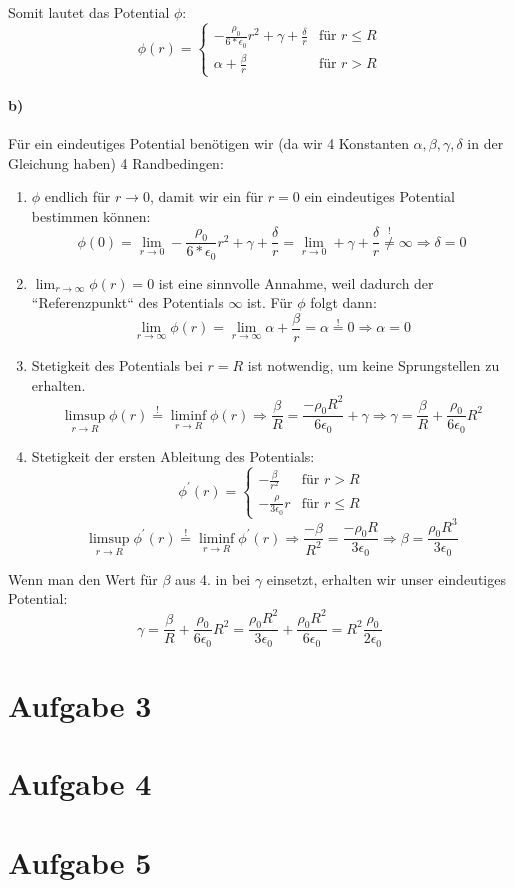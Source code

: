 \documentclass[a4paper]{article}
\newcommand{\epszero}{\epsilon_0}
\begin{document}
Somit lautet das Potential $\phi$:
\[
	\phi(r) =
	\begin{cases}
		-\frac{\rho_0}{6 * \epszero} r^2 + \gamma + \frac\delta r
		&\text{für } r \leq R \\
		\alpha + \frac\beta r 
		&\text{für } r > R
	\end{cases}
\]

\newpage
\paragraph{b)}
Für ein eindeutiges Potential benötigen wir (da wir 4 Konstanten $\alpha, \beta, \gamma, \delta$ in der Gleichung haben) 4 Randbedingen:
\begin{enumerate}
	\item $\phi$ endlich für $r\rightarrow 0$, damit wir ein für $r=0$ 
		ein eindeutiges Potential bestimmen können:
		\[
			\phi(0) = \lim_{r\rightarrow0} 
			-\frac{\rho_0}{6 * \epszero} r^2 
			+ \gamma 
			+ \frac\delta r
			= \lim_{r\rightarrow0} + \gamma
			+ \frac\delta r \overset{!}{\neq} \infty
			\Rightarrow
			\delta = 0
		\]
	\item $\lim_{r\rightarrow\infty} \phi(r) = 0$ ist eine sinnvolle 
		Annahme, weil dadurch der ``Referenzpunkt`` des Potentials 
		$\infty$ ist. Für $\phi$ folgt dann:
		\[
			\lim_{r\rightarrow\infty}
			\phi(r) 
			= \lim_{r\rightarrow\infty}
			\alpha + \frac\beta r 
			= \alpha 
			\overset{!}{=} 0
			\Rightarrow
			\alpha = 0
			\]
	\item Stetigkeit des Potentials bei $r = R$ ist notwendig, um keine
		Sprungstellen zu erhalten.
		\[
			\limsup_{r\rightarrow R} \phi(r)
			\overset{!}{=}
			\liminf_{r\rightarrow R} \phi(r)
			\Rightarrow
			\frac{\beta}{R} = 
			\frac{-\rho_0 R^2}{6 \epszero} + \gamma
			\Rightarrow
			\gamma = 
			\frac\beta R + \frac{\rho_0}{6 \epszero} R^2
		\]
	\item Stetigkeit der ersten Ableitung des Potentials:
		\[
			\phi^\prime(r) = 
			\begin{cases}
				-\frac{\beta}{r^2}
				&\text{für } r > R \\
				-\frac{\rho}{3\epszero} r
				&\text{für } r \leq R
			\end{cases}
		\]
		\[
			\limsup_{r\rightarrow R} \phi^\prime(r)
			\overset{!}{=}
			\liminf_{r\rightarrow R} \phi^\prime(r)
			\Rightarrow
			\frac{-\beta}{R^2} =
			\frac{-\rho_0 R}{3 \epszero}
			\Rightarrow
			\beta
			=
			\frac{\rho_0 R^3}{3 \epszero}
		\]
\end{enumerate}
Wenn man den Wert für $\beta$ aus 4. in bei $\gamma$ einsetzt, erhalten wir
unser eindeutiges Potential:
\[
	\gamma = \frac\beta R + \frac{\rho_0}{6 \epszero} R^2
	=
	\frac{\rho_0 R^2}{3 \epszero} + 
	\frac{\rho_0 R^2}{6 \epszero}
	= 
	R^2 \frac{\rho_0}{2 \epszero}
\]

\section*{Aufgabe 3}
\section*{Aufgabe 4}
\section*{Aufgabe 5}
\end{document}
